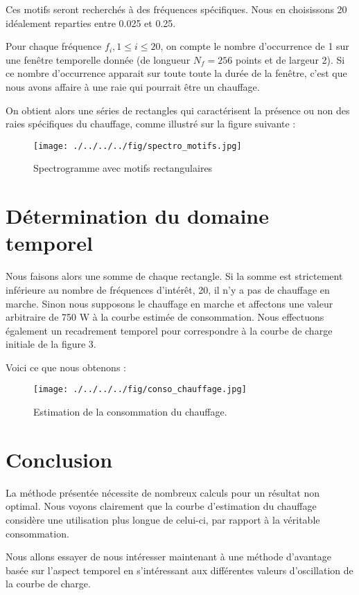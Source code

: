 \documentclass[10pt,a4paper]{article}
\begin{document}
Ces motifs seront recherchés à des fréquences spécifiques. Nous en choisissons 20 idéalement reparties entre 0.025 et 0.25.

Pour chaque fréquence $f_i, 1\le i \le 20$, on compte le nombre d'occurrence de 1 sur une fenêtre temporelle donnée (de longueur $N_f = 256$ points et de largeur 2).
Si ce nombre d'occurrence apparait sur toute toute la durée de la fenêtre, c'est que nous avons affaire à une raie qui pourrait être un chauffage.

On obtient alors une séries de rectangles qui caractérisent la présence ou non des raies spécifiques du chauffage, comme illustré sur la figure suivante :

\begin{figure}[!h]
\begin{center}
\texttt{[image: ./../../../fig/spectro\_motifs.jpg]}
\caption{Spectrogramme avec motifs rectangulaires}
\label{Figure}
\end{center}
\end{figure}

\section{Détermination du domaine temporel}

Nous faisons alors une somme de chaque rectangle. Si la somme est strictement inférieure au nombre de fréquences d'intérêt, 20, il n'y a pas de chauffage en marche. Sinon nous supposons le chauffage en marche et affectons une valeur arbitraire de 750 W à la courbe estimée de consommation. Nous effectuons également un recadrement temporel pour correspondre à la courbe de charge initiale de la figure 3.

Voici ce que nous obtenons :

\begin{figure}[!h]
\begin{center}
\texttt{[image: ./../../../fig/conso\_chauffage.jpg]}
\caption{Estimation de la consommation du chauffage.}
\label{Figure}
\end{center}
\end{figure}

\section{Conclusion}
La méthode présentée nécessite de nombreux calculs pour un résultat non optimal. Nous voyons clairement que la courbe d'estimation du chauffage considère une utilisation plus longue de celui-ci, par rapport à la véritable consommation.

Nous allons essayer de nous intéresser maintenant à une méthode d'avantage basée sur l'aspect temporel en s'intéressant aux différentes valeurs d'oscillation de la courbe de charge.
\end{document}

